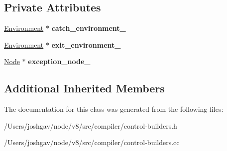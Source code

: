 \subsection*{Private Attributes}
\begin{DoxyCompactItemize}
\item 
\hyperlink{classv8_1_1internal_1_1compiler_1_1_ast_graph_builder_1_1_environment}{Environment} $\ast$ {\bfseries catch\+\_\+environment\+\_\+}\hypertarget{classv8_1_1internal_1_1compiler_1_1_try_catch_builder_a85b72cb5146628dfe8c838620e24738a}{}\label{classv8_1_1internal_1_1compiler_1_1_try_catch_builder_a85b72cb5146628dfe8c838620e24738a}

\item 
\hyperlink{classv8_1_1internal_1_1compiler_1_1_ast_graph_builder_1_1_environment}{Environment} $\ast$ {\bfseries exit\+\_\+environment\+\_\+}\hypertarget{classv8_1_1internal_1_1compiler_1_1_try_catch_builder_ad1f7c3ad08276c910d1ed22e32970fc3}{}\label{classv8_1_1internal_1_1compiler_1_1_try_catch_builder_ad1f7c3ad08276c910d1ed22e32970fc3}

\item 
\hyperlink{classv8_1_1internal_1_1compiler_1_1_node}{Node} $\ast$ {\bfseries exception\+\_\+node\+\_\+}\hypertarget{classv8_1_1internal_1_1compiler_1_1_try_catch_builder_a23ce7905c8e7877868d9c8f57636fbae}{}\label{classv8_1_1internal_1_1compiler_1_1_try_catch_builder_a23ce7905c8e7877868d9c8f57636fbae}

\end{DoxyCompactItemize}
\subsection*{Additional Inherited Members}


The documentation for this class was generated from the following files\+:\begin{DoxyCompactItemize}
\item 
/\+Users/joshgav/node/v8/src/compiler/control-\/builders.\+h\item 
/\+Users/joshgav/node/v8/src/compiler/control-\/builders.\+cc\end{DoxyCompactItemize}
